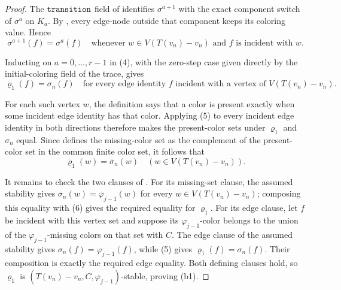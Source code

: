 \begin{proof}
The \({\tt transition}\) field of
 identifies
\(\sigma^{a+1}\) with the exact component switch of \(\sigma^a\) on
\(K_a\).  By , every edge-node outside
that component keeps its coloring value.  Hence
\[
 \sigma^{a+1}(f)=\sigma^a(f)
 \quad\text{whenever }w\in V(T(v_n)-v_n)\text{ and }f\text{ is incident
 with }w.                                                       \tag{4}
\]

Inducting on \(a=0,\ldots,r-1\) in (4), with the zero-step case given
directly by the initial-coloring field of the trace, gives
\[
 \varrho_1(f)=\sigma_n(f)
 \quad\text{for every edge identity }f\text{ incident with a vertex of
 }V(T(v_n)-v_n).                                               \tag{5}
\]

For each such vertex \(w\), the definition
 says that a color is present exactly when some
incident edge identity has that color.  Applying (5) to every incident
edge identity in both directions therefore makes the present-color sets
under \(\varrho_1\) and \(\sigma_n\) equal.  Since
 defines the missing-color set as the complement
of the present-color set in the common finite color set, it follows that
\[
 \overline{\varrho}_1(w)=\overline{\sigma}_n(w)
 \quad(w\in V(T(v_n)-v_n)).                                  \tag{6}
\]

It remains to check the two clauses of
.  For its missing-set clause, the
assumed stability gives
\(\overline{\sigma}_n(w)=\overline{\varphi}_{j-1}(w)\) for every
\(w\in V(T(v_n)-v_n)\); composing this equality with (6) gives the
required equality for \(\varrho_1\).  For its edge clause, let \(f\) be
incident with this vertex set and suppose its
\(\varphi_{j-1}\)-color belongs to the union of the
\(\varphi_{j-1}\)-missing colors on that set with \(C\).  The edge clause
of the assumed stability gives
\(\sigma_n(f)=\varphi_{j-1}(f)\), while (5) gives
\(\varrho_1(f)=\sigma_n(f)\).  Their composition is exactly the required
edge equality.  Both defining clauses hold, so \(\varrho_1\) is
\((T(v_n)-v_n,C,\varphi_{j-1})\)-stable, proving (b1).
\end{proof}
